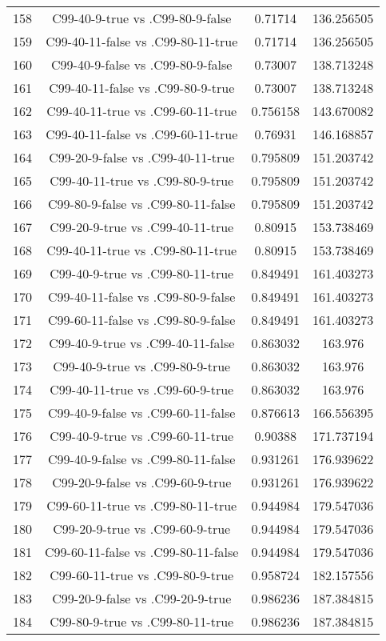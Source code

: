 \documentclass[a4paper,10pt]{article}
\begin{document}
\begin{landscape}
\begin{table}[!htp]
\begin{tabular}{cccc}
158&C99-40-9-true vs .C99-80-9-false&0.71714&136.256505\\
159&C99-40-11-false vs .C99-80-11-true&0.71714&136.256505\\
160&C99-40-9-false vs .C99-80-9-false&0.73007&138.713248\\
161&C99-40-11-false vs .C99-80-9-true&0.73007&138.713248\\
162&C99-40-11-true vs .C99-60-11-true&0.756158&143.670082\\
163&C99-40-11-false vs .C99-60-11-true&0.76931&146.168857\\
164&C99-20-9-false vs .C99-40-11-true&0.795809&151.203742\\
165&C99-40-11-true vs .C99-80-9-true&0.795809&151.203742\\
166&C99-80-9-false vs .C99-80-11-false&0.795809&151.203742\\
167&C99-20-9-true vs .C99-40-11-true&0.80915&153.738469\\
168&C99-40-11-true vs .C99-80-11-true&0.80915&153.738469\\
169&C99-40-9-true vs .C99-80-11-true&0.849491&161.403273\\
170&C99-40-11-false vs .C99-80-9-false&0.849491&161.403273\\
171&C99-60-11-false vs .C99-80-9-false&0.849491&161.403273\\
172&C99-40-9-true vs .C99-40-11-false&0.863032&163.976\\
173&C99-40-9-true vs .C99-80-9-true&0.863032&163.976\\
174&C99-40-11-true vs .C99-60-9-true&0.863032&163.976\\
175&C99-40-9-false vs .C99-60-11-false&0.876613&166.556395\\
176&C99-40-9-true vs .C99-60-11-true&0.90388&171.737194\\
177&C99-40-9-false vs .C99-80-11-false&0.931261&176.939622\\
178&C99-20-9-false vs .C99-60-9-true&0.931261&176.939622\\
179&C99-60-11-true vs .C99-80-11-true&0.944984&179.547036\\
180&C99-20-9-true vs .C99-60-9-true&0.944984&179.547036\\
181&C99-60-11-false vs .C99-80-11-false&0.944984&179.547036\\
182&C99-60-11-true vs .C99-80-9-true&0.958724&182.157556\\
183&C99-20-9-false vs .C99-20-9-true&0.986236&187.384815\\
184&C99-80-9-true vs .C99-80-11-true&0.986236&187.384815\\

\end{tabular}
\end{table}
\end{landscape}
\end{document}
